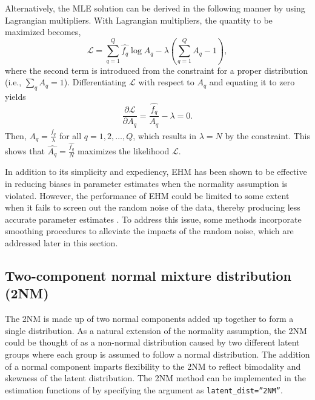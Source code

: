 Alternatively, the MLE solution can be derived in the following manner by
using Lagrangian multipliers. With Lagrangian multipliers, the
quantity to be maximized becomes,
\begin{equation}
\mathcal{L} = \sum_{q = 1}^{Q}{ \hat{f_{q}} \log{A_{q}} } -
\lambda \left( \sum_{q = 1}^{Q}{A_{q}} - 1 \right),
\label{eq:ehmmle}
\end{equation}
where the second term is introduced from the constraint for a proper
distribution (i.e., \(\sum_{q}{A_{q}} = 1\)). Differentiating
\(\mathcal{L}\) with respect to \(A_{q}\) and equating it to zero yields
\begin{equation}
\frac{\partial \mathcal{L}}{\partial A_{q}} =
\frac{\hat{f_{q}}}{A_{q}} - \lambda = 0.
\label{eq:ehmdiffern}
\end{equation}
Then, \(A_{q} = \frac{\hat{f_{q}}}{\lambda}\) for all
\(q = 1, 2, \dots, Q\), which results in \(\lambda = N\) by the constraint.
This shows that \(\hat{ A_{q}} = \frac{\hat{f_{q}}}{N}\) maximizes the
likelihood \(\mathcal{L}\).

In addition to its simplicity and expediency, EHM has been shown to
be effective in reducing biases in parameter estimates when the
normality assumption is violated. However, the performance of EHM could be
limited to some extent when it fails to screen out the random noise of the data,
thereby producing less accurate parameter estimates \citep{Li:2021, Woods:2015, Woods+Lin:2009}. To address this issue, some methods incorporate smoothing
procedures to alleviate the impacts of the random noise, which are
addressed later in this section.

\hypertarget{two-component-normal-mixture-distribution-2nm}{%
\subsection{Two-component normal mixture distribution (2NM)}\label{two-component-normal-mixture-distribution-2nm}}

The 2NM is made up of two normal components added up together to form a
single distribution. As a natural extension of the normality assumption,
the 2NM could be thought of as a non-normal distribution caused by two
different latent groups where each group is assumed to follow a normal
distribution. The addition of a normal component imparts flexibility to
the 2NM to reflect bimodality and skewness of the latent
distribution. The 2NM method can be implemented in the estimation
functions of  by specifying the argument as \texttt{latent\_dist=”2NM”}.

